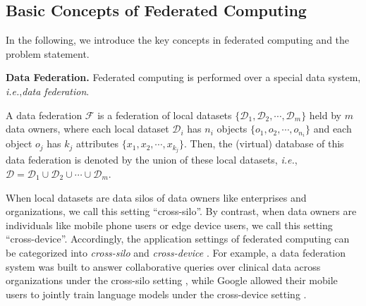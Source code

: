 \documentclass[11pt]{article}
\newcommand{\ie}{\textit{i.e.},\xspace}
\newcommand{\fakeparagraph}[1]{\vspace{1mm}\noindent\textbf{#1.}}
\newcommand{\F}{\mathcal{F}}
\newcommand{\D}{\mathcal{D}}
\newcommand{\obj}{o}
\begin{document}
\subsection{Basic Concepts of Federated Computing}\label{sec:concept-def}

In the following, we introduce the key concepts in federated computing
and the problem statement.

\fakeparagraph{Data Federation}
Federated computing is performed over a special data system, \ie \textit{data federation}.

\begin{definition}\label{def:fed-data}
A data federation $\F$ is a federation of local datasets $\{\D_1, \D_2, \cdots, \D_m\}$ held by $m$ data owners, where each local dataset $\D_i$ has $n_i$ objects $\{\obj_1, \obj_2, \cdots, \obj_{n_i}\}$ and each object $\obj_j$ has $k_j$ attributes $\{x_1, x_2, \cdots, x_{k_j}\}$.
Then, the (virtual) database of this data federation is denoted by the union of these local datasets, \ie $\D = \D_1 \cup \D_2 \cup \cdots \cup \D_m$.
\end{definition}

When local datasets are data silos of data owners like enterprises and organizations, 
we call this setting ``cross-silo''.
By contrast, when data owners are individuals like mobile phone users or edge device users,
we call this setting ``cross-device''.
Accordingly, the application settings of federated computing can be categorized into \textit{cross-silo} and \textit{cross-device} \cite{DBLP:journals/ftml/KairouzMABBBBCC21}.
For example, a data federation system was built to answer collaborative queries over clinical data across organizations under the cross-silo setting \cite{science2016A}, while Google allowed their mobile users to jointly train language models under the cross-device setting \cite{DBLP:conf/aistats/McMahanMRHA17}.
\end{document}
